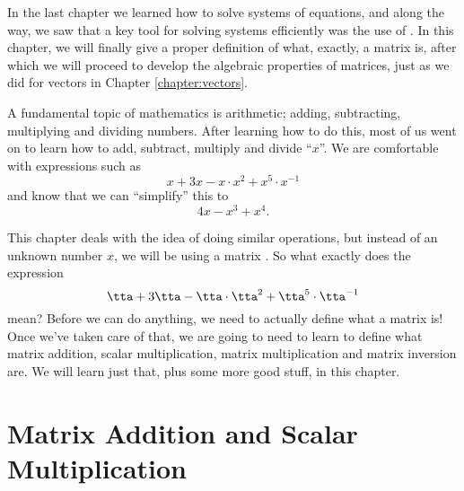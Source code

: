 
In the last chapter we learned how to solve systems of equations, and along the way, we saw that a key tool for solving systems efficiently was the use of . In this chapter, we will finally give a proper definition of what, exactly, a matrix is, after which we will proceed to develop the algebraic properties of matrices, just as we did for vectors in Chapter \ref{chapter:vectors}.

A fundamental topic of mathematics is arithmetic; adding, subtracting, multiplying and dividing numbers. After learning how to do this, most of us went on to learn how to add, subtract, multiply and divide ``$x$''. We are comfortable with expressions such as 
\[
x+3x-x\cdot x^2+x^5\cdot x^{-1}
\]
and know that we can ``simplify'' this to 
\[
4x-x^3+x^4.
\]

This chapter deals with the idea of doing similar operations, but instead of an unknown number $x$, we will be using a matrix \tta. So what exactly does the expression 
\[
\tta+3\tta-\tta\cdot \tta^2+\tta^5\cdot \tta^{-1}
\]
mean? Before we can do anything, we need to actually define what a matrix is! Once we've taken care of that, we are going to need to learn to define what matrix addition, scalar multiplication, matrix multiplication and matrix inversion are. We will learn just that, plus some more good stuff, in this chapter.

\section{Matrix Addition and Scalar Multiplication}\label{sec:matrix_arithmetic_1}


